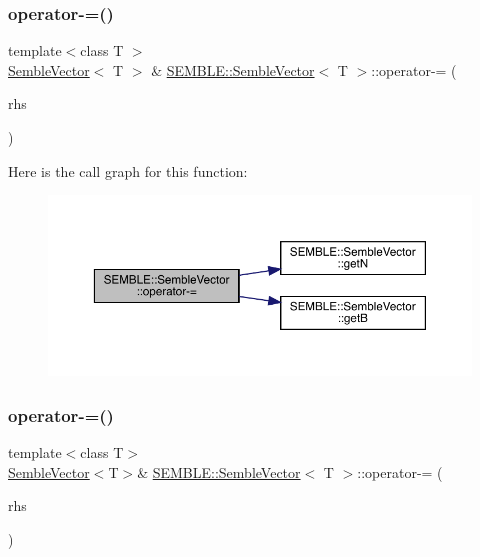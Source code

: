 \subsubsection{\texorpdfstring{operator-\/=()}{operator-=()}\hspace{0.1cm}{\footnotesize\ttfamily [1/4]}}
{\footnotesize\ttfamily template$<$class T $>$ \\
\mbox{\hyperlink{structSEMBLE_1_1SembleVector}{Semble\+Vector}}$<$ T $>$ \& \mbox{\hyperlink{structSEMBLE_1_1SembleVector}{S\+E\+M\+B\+L\+E\+::\+Semble\+Vector}}$<$ T $>$\+::operator-\/= (\begin{DoxyParamCaption}\item[{const \mbox{\hyperlink{structSEMBLE_1_1SembleVector}{Semble\+Vector}}$<$ T $>$ \&}]{rhs }\end{DoxyParamCaption})}

Here is the call graph for this function\+:
\nopagebreak
\begin{figure}[H]
\begin{center}
\leavevmode
\includegraphics[width=350pt]{d9/d94/structSEMBLE_1_1SembleVector_a600811dfe84b74625135fb1913aaa4ea_cgraph}
\end{center}
\end{figure}
\mbox{\label{structSEMBLE_1_1SembleVector_aa425a7c40009b81492d52d77de3f9eab}} 
\subsubsection{\texorpdfstring{operator-\/=()}{operator-=()}\hspace{0.1cm}{\footnotesize\ttfamily [2/4]}}
{\footnotesize\ttfamily template$<$class T$>$ \\
\mbox{\hyperlink{structSEMBLE_1_1SembleVector}{Semble\+Vector}}$<$T$>$\& \mbox{\hyperlink{structSEMBLE_1_1SembleVector}{S\+E\+M\+B\+L\+E\+::\+Semble\+Vector}}$<$ T $>$\+::operator-\/= (\begin{DoxyParamCaption}\item[{const \mbox{\hyperlink{structSEMBLE_1_1SembleVector}{Semble\+Vector}}$<$ T $>$ \&}]{rhs }\end{DoxyParamCaption})}

